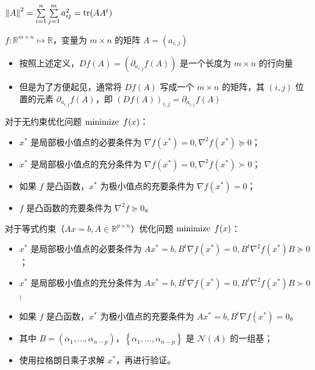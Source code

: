 \begin{remark}
	$\norm{A}^2 = \sum\limits_{i = 1}^n\sum\limits_{j = 1}^m a_{ij}^2 = \tr(AA^t)$
\end{remark}

\begin{remark}
    $f: \mathbb{R}^{m \times n} \mapsto \mathbb{R}$，变量为 $m \times n$ 的矩阵 $A = (a_{i, j})$\begin{itemize}
        \item 按照上述定义，$Df(A) = (\partial_{a_{i, j}}f(A))$ 是一个长度为 $m \times n$ 的行向量
        \item 但是为了方便起见，通常将 $Df(A)$ 写成一个 $m \times n$ 的矩阵，其 $(i, j)$ 位置的元素 $\partial_{a_{i, j}}f(A)$，即 $(Df(A))_{i, j} = \partial_{a_{i, j}}f(A)$
    \end{itemize}
\end{remark}

\begin{remark}
	对于无约束优化问题 $\minimize\ f(x)$：
	\begin{itemize}
		\item $x^*$ 是局部极小值点的必要条件为 $\nabla f(x^*) = 0, \nabla^2f(x^*)\succeq 0$；
		\item $x^*$ 是局部极小值点的充分条件为 $\nabla f(x^*) = 0, \nabla^2f(x^*)\succ 0$；
		\item 如果 $f$ 是凸函数，$x^*$ 为极小值点的充要条件为 $\nabla f(x^*) = 0$；
		\item $f$ 是凸函数的充要条件为 $\nabla^2f\succeq 0$。
	\end{itemize}
\end{remark}

\begin{remark}
	对于等式约束（$Ax=b, A\in \mathbb{R}^{p\times n}$）优化问题 $\minimize\ f(x)$：
	\begin{itemize}
		\item $x^*$ 是局部极小值点的必要条件为 $Ax^*=b, B^t\nabla f(x^*) = 0, B^t\nabla^2f(x^*)B \succeq 0$；
		\item $x^*$ 是局部极小值点的充分条件为 $Ax^*=b, B^t\nabla f(x^*) = 0, B^t\nabla^2f(x^*)B \succ 0$;
		\item 如果 $f$ 是凸函数，$x^*$ 为极小值点的充要条件为 $Ax^*=b, B^t\nabla f(x^*) = 0$。
		\item 其中 $B=(\alpha_1, \dots, \alpha_{n - p})$，$\left\{\alpha_1, \dots, \alpha_{n - p}\right\}$ 是 $\mathcal{N}(A)$ 的一组基；
		\item 使用拉格朗日乘子求解 $x^*$，再进行验证。
	\end{itemize}
\end{remark}

